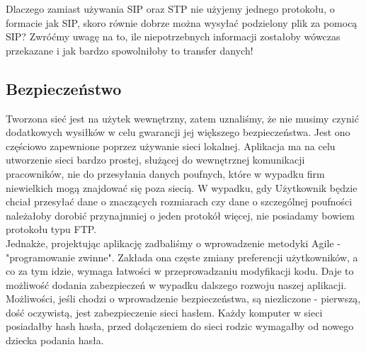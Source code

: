 Dlaczego zamiast używania SIP oraz STP nie użyjemy jednego protokołu, o formacie jak SIP, skoro równie dobrze można wysyłać podzielony plik za pomocą SIP? Zwróćmy uwagę na to, ile niepotrzebnych informacji zostałoby wówczas przekazane i jak bardzo spowolniłoby to transfer danych!

\subsection{Bezpieczeństwo}
Tworzona sieć jest na użytek wewnętrzny, zatem uznaliśmy, że nie musimy czynić dodatkowych wysiłków w celu gwarancji jej większego bezpieczeństwa. Jest ono częściowo zapewnione poprzez używanie sieci lokalnej. Aplikacja ma na celu utworzenie sieci bardzo prostej, służącej do wewnętrznej komunikacji pracowników, nie do przesyłania danych poufnych, które w wypadku firm niewielkich mogą znajdować się poza siecią. W wypadku, gdy Użytkownik będzie chciał przesyłać dane o znaczących rozmiarach czy dane o szczególnej poufności należałoby dorobić przynajmniej o jeden protokół więcej, nie posiadamy bowiem protokołu typu FTP.\\
Jednakże, projektując aplikację zadbaliśmy o wprowadzenie metodyki Agile - "programowanie zwinne". Zakłada ona częste zmiany preferencji użytkowników, a co za tym idzie, wymaga łatwości w przeprowadzaniu modyfikacji kodu. Daje to możliwość dodania zabezpieczeń w wypadku dalszego rozwoju naszej aplikacji. \\
Możliwości, jeśli chodzi o wprowadzenie bezpieczeństwa, są niezliczone - pierwszą, dość oczywistą, jest zabezpieczenie sieci hasłem. Każdy komputer w sieci posiadałby hash hasła, przed dołączeniem do sieci rodzic wymagałby od nowego dziecka podania hasła.
